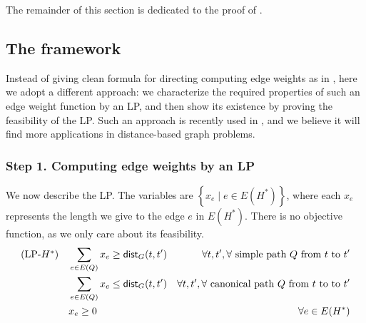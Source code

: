 \documentclass[11pt]{article}
\newtheorem{lemma}[theorem]{Lemma}
\newcommand{\dist}{\textnormal{\textsf{dist}}}
\newcommand{\set}[1]{\left\{ #1 \right\}}
\begin{document}
The remainder of this section is dedicated to the proof of .

\subsection{The framework}
\label{subsec: weight overview}

Instead of giving clean formula for directing computing edge weights as in \cite{ChangO20}, here we adopt a different approach: we characterize the required properties of such an edge weight function by an LP, and then show its existence by proving the feasibility of the LP. %
Such an approach is recently used in \cite{chen2025path}, and we believe it will find more applications in distance-based graph problems.

\subsubsection*{Step 1. Computing edge weights by an LP}


We now describe the LP. The variables are $\set{x_e\mid e\in E(H^*)}$, where each $x_e$ represents the length we give to the edge $e$ in $E(H^*)$. There is no objective function, as we only care about its feasibility.
%
\begin{eqnarray*}
	\mbox{(LP-$H^*$)}	\quad
&\sum_{e\in E(Q)}x_e\geq \dist_G(t,t') &\forall t,t', \forall \text{ simple path }Q\text{  from }t \text{ to  }t'\\
&\sum_{e\in E(Q)}x_e\leq \dist_G(t,t') &\forall t,t', \forall \text{ canonical path }Q\text{ from }t \text{ to to }t'\\
	&x_e\geq 0&\forall e\in E(H^*)
\end{eqnarray*}
\end{document}
